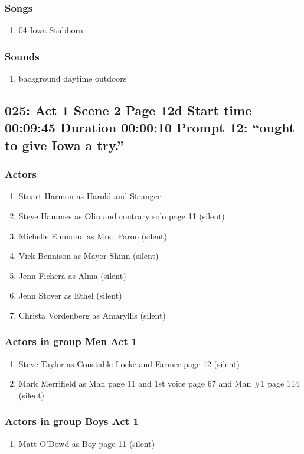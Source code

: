 \subsubsection{Songs}
\begin{enumerate}
\item 04 Iowa Stubborn
\end{enumerate}\subsubsection{Sounds}
\begin{enumerate}
\item background daytime outdoors
\end{enumerate}
\subsection{025: Act 1 Scene 2 Page 12d Start time 00:09:45 Duration 00:00:10 Prompt 12: ``ought to give Iowa a try.''}

\subsubsection{Actors}
\begin{enumerate}
\item Stuart Harmon as Harold and Stranger
\item Steve Hammes as Olin and contrary solo page 11 (silent)
\item Michelle Emmond as Mrs.~Paroo (silent)
\item Vick Bennison as Mayor Shinn (silent)
\item Jenn Fichera as Alma (silent)
\item Jenn Stover as Ethel (silent)
\item Christa Vordenberg as Amaryllis (silent)
\end{enumerate}
\subsubsection{Actors in group Men Act 1}
\begin{enumerate}
\item Steve Taylor as Constable Locke and Farmer page 12 (silent)
\item Mark Merrifield as Man page 11 and 1st voice page 67 and Man \#1 page 114 (silent)
\end{enumerate}
\subsubsection{Actors in group Boys Act 1}
\begin{enumerate}
\item Matt O'Dowd as Boy page 11 (silent)
\end{enumerate}
